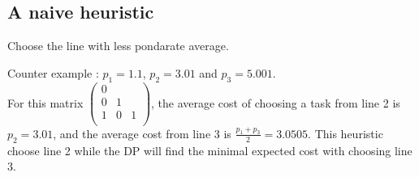 \documentclass{article}
\begin{document}
\subsection{A naive heuristic}
Choose the line with less pondarate average.

Counter example : $p_1 = 1.1$, $p_2 = 3.01$ and $p_3=5.001$.\\
For this matrix $\begin{pmatrix}
            0 &   &   \\
            0 & 1 &   \\ 
            1 & 0 & 1 \\
        \end{pmatrix}$, the average cost of choosing a task from line 2 is $p_2=3.01$, and the average cost from line 3 is $\frac{p_1+p_3}{2}=3.0505$. This heuristic choose line 2 while the DP will find the minimal expected cost with choosing line 3.
 
\end{document}
